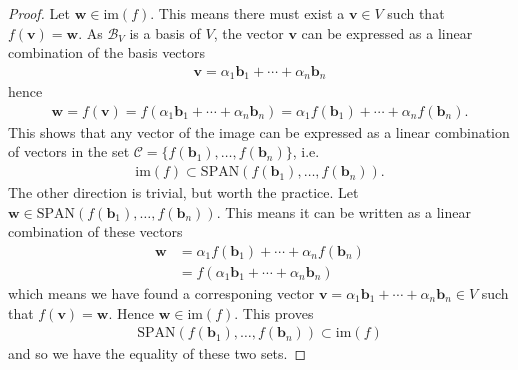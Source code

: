 
\begin{proof}
Let $\mathbf{w}\in \text{im}(f)$. This means there must exist a $\mathbf{v}\in V$ such that $f(\mathbf{v})=\mathbf{w}$. As $\mathcal{B}_V$ is a basis of $V$, the vector $\mathbf{v}$ can be expressed as a linear combination of the basis vectors
\begin{align*}
\mathbf{v} = \alpha_1 \mathbf{b}_1 + \cdots + \alpha_n \mathbf{b}_n
\end{align*}
hence
\begin{align*}
\mathbf{w} = f(\mathbf{v}) = f(\alpha_1 \mathbf{b}_1 + \cdots + \alpha_n \mathbf{b}_n) = \alpha_1 f(\mathbf{b}_1) + \cdots + \alpha_n f(\mathbf{b}_n).
\end{align*}
This shows that any vector of the image can be expressed as a linear combination of vectors in the set $\mathcal{C}=\{f(\mathbf{b}_1),\dots, f(\mathbf{b}_n)\}$, i.e.
\begin{align*}
\text{im}(f) \subset \text{SPAN}\left( f(\mathbf{b}_1),\dots, f(\mathbf{b}_n) \right).
\end{align*}
The other direction is trivial, but worth the practice. Let $\mathbf{w}\in \text{SPAN}\left( f(\mathbf{b}_1),\dots, f(\mathbf{b}_n) \right)$. This means it can be written as a linear combination of these vectors
\begin{align*}
\mathbf{w} &= \alpha_1 f(\mathbf{b}_1) + \cdots + \alpha_n f(\mathbf{b}_n) \\
&= f(\alpha_1 \mathbf{b}_1 + \cdots + \alpha_n \mathbf{b}_n)
\end{align*}
which means we have found a corresponing vector $\mathbf{v}=\alpha_1 \mathbf{b}_1 + \cdots + \alpha_n \mathbf{b}_n \in V$ such that $f(\mathbf{v}) = \mathbf{w}$. Hence $\mathbf{w}\in \text{im}(f)$. This proves 
\begin{align*}
\text{SPAN}\left( f(\mathbf{b}_1),\dots, f(\mathbf{b}_n) \right) \subset \text{im}(f)
\end{align*}
and so we have the equality of these two sets.
\end{proof}

